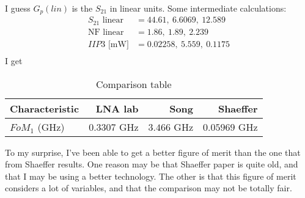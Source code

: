 \noindent I guess $G_p (lin)$ is the $S_{21}$ in linear units. Some intermediate calculations:
\begin{equation}
   \begin{split}
   S_{21} \text{ linear} &= 44.61, \ 6.6069, \ 12.589 \\ 
   \text{NF linear} &= 1.86, \ 1.89, \ 2.239 \\ 
   IIP3 \text{ [mW]} &= 0.02258, \ 5.559, \ 0.1175 \\ 
   \end{split}
\end{equation}
\noindent I get
\begin{table}[H] \centering
   \begin{tabular}{ |l|r|r|r| } \hline
       Characteristic & LNA lab & Song & Shaeffer \\ \hline \hline
       $FoM_1$ (GHz) & $0.3307$ GHz & $3.466$ GHz & $0.05969$ GHz \\ \hline %
   \end{tabular}
   \caption{Comparison table}
\end{table}
 
\noindent To my surprise, I've been able to get a better figure of merit than the one that from Shaeffer results. One reason may be that Shaeffer paper is quite old, and that I may be using a better technology. The other is that this figure of merit considers a lot of variables, and that the comparison may not be totally fair.



























